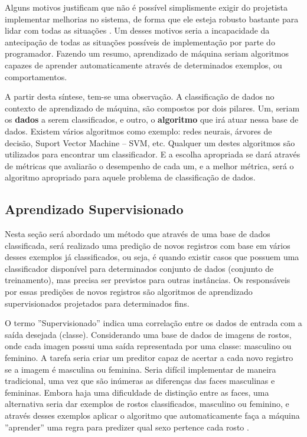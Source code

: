 Alguns motivos justificam que não é possível simplismente exigir do projetista implementar melhorias no sistema, de forma que ele esteja robusto bastante para lidar com todas as situações \cite{RusselStuart.Norvig2013}. Um  desses motivos seria a incapacidade da antecipação de todas as situações possíveis de implementação por parte do programador. Fazendo um resumo, aprendizado de máquina seriam algoritmos capazes de aprender automaticamente através de  determinados exemplos, ou comportamentos. 

A partir desta síntese, tem-se uma observação. A classificação de dados no contexto de aprendizado de máquina, são compostos por dois pilares. Um, seriam os \textbf{dados} a serem classificados, e outro, o \textbf{algoritmo} que irá atuar nessa base de dados. Existem vários algoritmos como exemplo: redes neurais, árvores de decisão, Suport Vector Machine – SVM, etc. Qualquer um destes algoritmos são utilizados para encontrar um classificador. E a escolha apropriada se dará através de métricas que avaliarão o desempenho de cada um, e a melhor métrica, será o algoritmo apropriado para aquele problema de classificação de dados. 


\subsection{Aprendizado Supervisionado}\label{cap:refTeor:ssec:aprendSup}

Nesta seção será abordado um método que através de uma base de dados classificada, será realizado uma predição de novos registros com base em vários desses exemplos já classificados, ou seja, é quando existir casos que possuem uma classificador disponível para determinados conjunto de dados (conjunto de treinamento), mas precisa ser previstos para outras instâncias. Os responsáveis por essas predições de novos registros são algoritmos de aprendizado supervisionados projetados para determinados fins.


O termo ''Supervisionado'' indica uma correlação entre os dados de entrada com a saída desejada (classe). Considerando uma base de dados de imagens de rostos, onde cada imagen possui uma saída representada por uma classe: masculino ou feminino. A tarefa seria criar um preditor capaz de acertar a cada novo registro se a imagem é masculina ou feminina. Seria  difícil  implementar de maneira tradicional, uma vez que são inúmeras as diferenças das faces masculinas e femininas. Embora haja uma dificuldade de distinção entre as faces, uma alternativa seria dar exemplos de rostos classificados, masculino ou feminino,  e através desses exemplos aplicar o algoritmo que automaticamente faça a máquina ''aprender'' uma regra para predizer qual sexo pertence cada rosto  \cite{Barber2011}.


